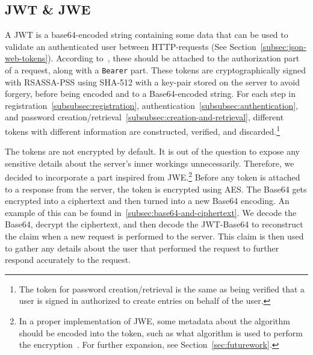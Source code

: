 \subsection{JWT \& JWE}\label{subsec:jwt}
A JWT is a base64-encoded string containing some data that can be used to
validate an authenticated user between HTTP-requests (See
Section~\ref{subsec:json-web-tokens}).
According to~\cite{RFC7519}, these should be attached to the authorization
part of a request, along with a \texttt{Bearer} part.
These tokens are cryptographically signed with RSASSA-PSS using SHA-512 with
a key-pair stored on the server to avoid forgery, before being encoded and to a
Base64-encoded string.
For each step in registration~\ref{subsubsec:registration},
authentication~\ref{subsubsec:authentication}, and
password creation/retrieval~\ref{subsubsec:creation-and-retrieval}, different
tokens with different information are constructed, verified, and
discarded.\footnote{
  The token for password creation/retrieval is the same as being verified
  that a user is signed in authorized to create entries on behalf of the user.
}

The tokens are not encrypted by default.
It is out of the question to expose any sensitive details about the server's
inner workings unnecessarily.
Therefore, we decided to incorporate a part inspired from JWE.\footnote{
  In a proper implementation of JWE, some metadata about the algorithm should
  be encoded into the token, such as what algorithm is used to perform the
  encryption~\cite{rfc7516}. For further expansion, see
  Section~\ref{sec:futurework}.
}
Before any token is attached to a response from the server, the token is
encrypted using AES\@.
The Base64 gets encrypted into a ciphertext and then turned into a new Base64
encoding.
An example of this can be found in~\ref{subsec:base64-and-ciphertext}.
We decode the Base64, decrypt the ciphertext, and then decode the JWT-Base64 to
reconstruct the claim when a new request is performed to the server.
This claim is then used to gather any details about the user that performed
the request to further respond accurately to the request.

%

